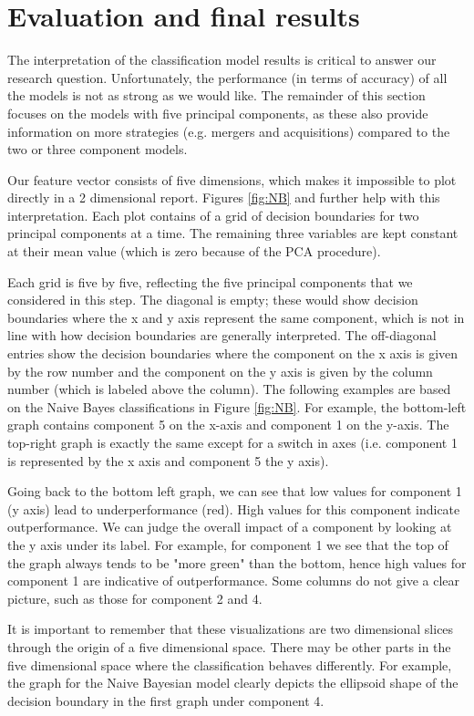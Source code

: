 \documentclass{article}
\begin{document}
\clearpage
\section{Evaluation and final results}
The interpretation of the classification model results is critical to answer our research question. Unfortunately, the performance (in terms of accuracy) of all the models is not as strong as we would like. The remainder of this section focuses on the models with five principal components, as these also provide information on more strategies (e.g. mergers and acquisitions) compared to the two or three component models.

Our feature vector consists of five dimensions, which makes it impossible to plot directly in a 2 dimensional report. Figures \ref{fig:NB} and further help with this interpretation. Each plot contains of a grid of decision boundaries for two principal components at a time. The remaining three variables are kept constant at their mean value (which is zero because of the PCA procedure). 

Each grid is five by five, reflecting the five principal components that we considered in this step. The diagonal is empty; these would show decision boundaries where the x and y axis represent the same component, which is not in line with how decision boundaries are generally interpreted. The off-diagonal entries show the decision boundaries where the component on the x axis is given by the row number and the component on the y axis is given by the column number (which is labeled above the column). The following examples are based on the Naive Bayes classifications in Figure \ref{fig:NB}. For example, the bottom-left graph contains component 5 on the x-axis and component 1 on the y-axis. The top-right graph is exactly the same except for a switch in axes (i.e. component 1 is represented by the x axis and component 5 the y axis).

Going back to the bottom left graph, we can see that low values for component 1 (y axis) lead to underperformance (red). High values for this component indicate outperformance. We can judge the overall impact of a component by looking at the y axis under its label. For example, for component 1 we see that the top of the graph always tends to be "more green" than the bottom, hence high values for component 1 are indicative of outperformance. Some columns do not give a clear picture, such as those for component 2 and 4. 

It is important to remember that these visualizations are two dimensional slices through the origin of a five dimensional space. There may be other parts in the five dimensional space where the classification behaves differently. For example, the graph for the Naive Bayesian model clearly depicts the ellipsoid shape of the decision boundary in the first graph under component 4. 
\end{document}
